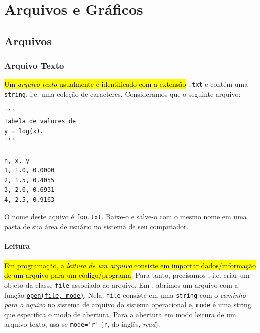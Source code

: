 
\chapter{Arquivos e Gráficos}\label{cap_ag}
\thispagestyle{fancy}

\section{Arquivos}\label{cap_ag_sec_arq}

\subsection{Arquivo Texto}

\hl{Um \emph{arquivo texto} usualmente é identificado com a extensão }\lstinline+.txt+{ e contém uma {\lstinline+string+}}, i.e. uma coleção de caracteres. Consideramos que o seguinte arquivo:

\begin{lstlisting}[caption = foo.txt, label=cap_ag_sec_arq:cod:foo.txt]
'''
Tabela de valores de
y = log(x).
'''

n, x, y
1, 1.0, 0.0000
2, 1.5, 0.4055
3, 2.0, 0.6931
4, 2.5, 0.9163
\end{lstlisting}

O nome deste aquivo é \lstinline+foo.txt+. Baixe-o e salve-o com o mesmo nome em uma pasta de sua área de usuário no sistema de seu computador.

\subsubsection{Leitura}

\hl{Em programação, a \emph{leitura de um arquivo} consiste em importar dados/informação de um arquivo para um código/programa}. Para tanto, precisamos , i.e. criar um objeto da classe \lstinline+file+ associado ao arquivo. Em {\python}, abrimos um arquivo com a função \href{https://docs.python.org/3/library/functions.html\#open}{\lstinline+open(file, mode)+}. Nela, \lstinline+file+ consiste em uma \lstinline+string+ com o \emph{caminho para o aquivo} no sistema de arquivo do sistema operacional e, \lstinline+mode+ é uma string que especifica o modo de abertura. Para a abertura em modo leitura de um arquivo texto, usa-se \lstinline+mode='r'+ (\lstinline+r+, do inglês, \textit{read}).

